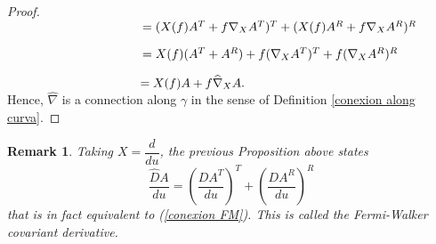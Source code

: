 \documentclass[11pt]{book}
\newtheorem{rem}[defi]{Remark}
\begin{document}
\begin{proof}
	\vspace{1mm}
	$\hspace{38mm}=(X(f)A^T + f\nabla_{X} A^T)^T + (X(f)A^R + f\nabla_{X} A^R)^R\hspace{4mm}$ 
	
	\vspace{1mm}
	$\hspace{38mm}=X(f)(A^T+A^R) + f(\nabla_{X} A^T)^T + f(\nabla_{X} A^R)^R\hspace{11mm}$ 
	
	\vspace{1mm}
	$\hspace{38mm}=X(f)A + f\widehat{\nabla}_{X} A.\hspace{60mm}$ \\
	Hence, $\widehat{\nabla}$ is a connection along $\gamma$ in the sense of Definition \ref{conexion along curva}. 
\end{proof}

\begin{rem}
	{\rm
	Taking $X=\dfrac{d}{du}$, the previous Proposition above states
	\begin{equation}\label{expresion der cov FM}
		\frac{\widehat{D}A}{du}=\left(\frac{DA^T}{du}\right)^T+\left(\frac{DA^R}{du}\right)^R
	\end{equation}
	that is in fact equivalent to (\ref{conexion FM}). This is called the Fermi-Walker covariant derivative.} 
\end{rem}
\end{document}
